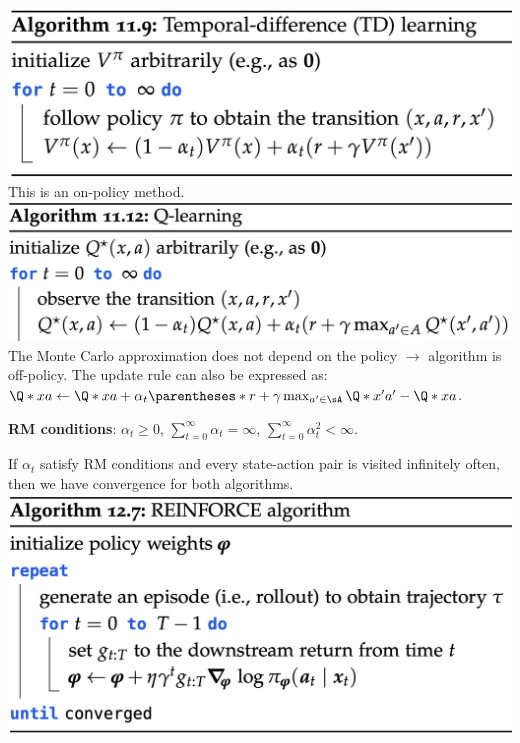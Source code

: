 \includegraphics[width=0.95\linewidth,trim={0 0 4cm 0}]{images/TD_learning.png}
This is an on-policy method.
\includegraphics[width=0.95\linewidth, trim={0 0 3cm 0}]{images/Q_learning.png}
The Monte Carlo approximation does not depend on the policy $\rightarrow$ algorithm is off-policy. The update rule can also be expressed as: $\Q*{x}{a} \gets \Q*{x}{a} + \alpha_t\parentheses*{r + \gamma \max_{a' \in \sA} \Q*{x'}{a'} - \Q*{x}{a}}$.
\begin{framed}
    \textbf{RM conditions}: $\alpha_t \geq 0$, $\sum_{t=0}^{\infty}{\alpha_t} = \infty$, $\sum_{t=0}^{\infty}{\alpha_t^2} < \infty$.
\end{framed}
If $\alpha_t$ satisfy RM conditions and every state-action pair is visited infinitely often, then we have convergence for both algorithms.
\includegraphics[width=\linewidth]{images/REINFORCE.png}

